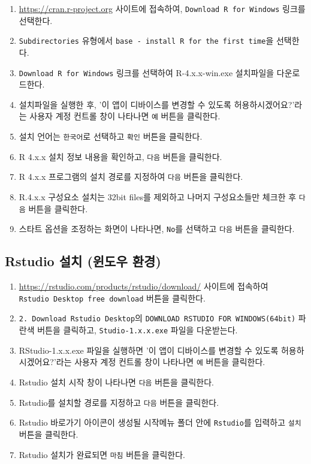 \documentclass[
  11pt,
  krantz2, a4paper, twoside]{krantz}
\providecommand{\tightlist}{%
  \setlength{\itemsep}{0pt}\setlength{\parskip}{0pt}}
\theoremstyle{definition}
\theoremstyle{definition}
\theoremstyle{definition}
\theoremstyle{definition}
\theoremstyle{remark}
\begin{document}
\begin{enumerate}
\def\labelenumi{\arabic{enumi}.}
\tightlist
\item
  \url{https://cran.r-project.org} 사이트에 접속하여, \texttt{Download\ R\ for\ Windows} 링크를 선택한다.
\item
  \texttt{Subdirectories} 유형에서 \texttt{base\ -\ install\ R\ for\ the\ first\ time}을 선택한다.
\item
  \texttt{Download\ R\ for\ Windows} 링크를 선택하여 R-4.x.x-win.exe 설치파일을 다운로드한다.
\item
  설치파일을 실행한 후, '이 앱이 디바이스를 변경할 수 있도록 허용하시겠어요?'라는 사용자 계정 컨트롤 창이 나타나면 \texttt{예} 버튼을 클릭한다.
\item
  설치 언어는 \texttt{한국어}로 선택하고 \texttt{확인} 버튼을 클릭한다.
\item
  R 4.x.x 설치 정보 내용을 확인하고, \texttt{다음} 버튼을 클릭한다.
\item
  R 4.x.x 프로그램의 설치 경로를 지정하여 \texttt{다음} 버튼을 클릭한다.
\item
  R.4.x.x 구성요소 설치는 32bit files를 제외하고 나머지 구성요소들만 체크한 후 \texttt{다음} 버튼을 클릭한다.
\item
  스타트 옵션을 조정하는 화면이 나타나면, \texttt{No}를 선택하고 \texttt{다음} 버튼을 클릭한다.
\end{enumerate}

\hypertarget{rstudio-uxc124uxce58-uxc708uxb3c4uxc6b0-uxd658uxacbd}{%
\subsection{Rstudio 설치 (윈도우 환경)}\label{rstudio-uxc124uxce58-uxc708uxb3c4uxc6b0-uxd658uxacbd}}

\begin{enumerate}
\def\labelenumi{\arabic{enumi}.}
\tightlist
\item
  \url{https://rstudio.com/products/rstudio/download/} 사이트에 접속하여 \texttt{Rstudio\ Desktop\ free\ download} 버튼을 클릭한다.
\item
  \texttt{2.\ Download\ Rstudio\ Desktop}의 \texttt{DOWNLOAD\ RSTUDIO\ FOR\ WINDOWS(64bit)} 파란색 버튼을 클릭하고, \texttt{Studio-1.x.x.exe} 파일을 다운받는다.
\item
  RStudio-1.x.x.exe 파일을 실행하면 '이 앱이 디바이스를 변경할 수 있도록 허용하시겠어요?'라는 사용자 계정 컨트롤 창이 나타나면 \texttt{예} 버튼을 클릭한다.
\item
  Rstudio 설치 시작 창이 나타나면 \texttt{다음} 버튼을 클릭한다.
\item
  Rstudio를 설치할 경로를 지정하고 \texttt{다음} 버튼을 클릭한다.
\item
  Rstudio 바로가기 아이콘이 생성될 시작메뉴 폴더 안에 \texttt{Rstudio}를 입력하고 \texttt{설치} 버튼을 클릭한다.
\item
  Rstudio 설치가 완료되면 \texttt{마침} 버튼을 클릭한다.
\end{enumerate}
\end{document}
